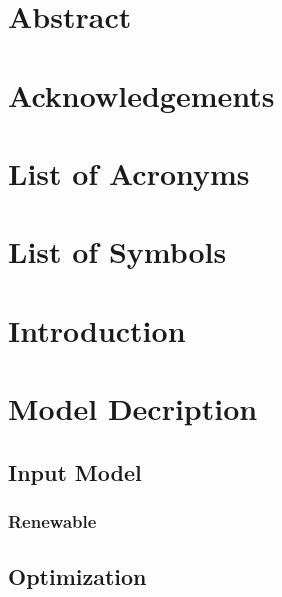 \documentclass[a4paper,11pt,twoside,onecolumn]{book}
\begin{document}
\frontmatter




\chapter*{Abstract}
%
\newpage


\chapter*{Acknowledgements}
%
\newpage


\tableofcontents
\newpage



\chapter*{List of Acronyms}
%

\chapter*{List of Symbols}
%




\mainmatter

\chapter{Introduction}
%

%
\chapter{Model Decription}
\label{ch:model}
%
\section{Input Model}
\subsection{Renewable}

\section{Optimization}
\end{document}
